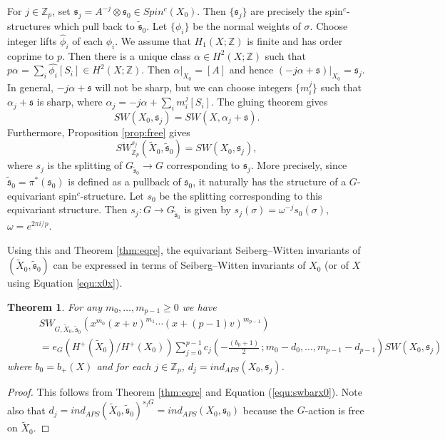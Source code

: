 \documentclass{amsart}
\newtheorem{theorem}{Theorem}[section]
\theoremstyle{definition}
\theoremstyle{remark}
\numberwithin{equation}{section}
\begin{document}
For $j \in \mathbb{Z}_p$, set $\mathfrak{s}_j = A^{-j} \otimes \mathfrak{s}_0 \in Spin^c(X_0)$. Then $\{ \mathfrak{s}_j \}$ are precisely the spin$^c$-structures which pull back to $\widetilde{\mathfrak{s}}_0$. Let $\{ \phi_i \}$ be the normal weights of $\sigma$. Choose integer lifts $\widehat{\phi}_i$ of each $\phi_i$. We assume that $H_1(X ; \mathbb{Z})$ is finite and has order coprime to $p$. Then there is a unique class $\alpha \in H^2(X ; \mathbb{Z})$ such that $p \alpha = \sum_i \widehat{\phi_i} [S_i] \in H^2(X ; \mathbb{Z})$. Then $\alpha|_{X_0} = [A]$ and hence $(-j \alpha + \mathfrak{s})|_{X_0} = \mathfrak{s}_j$. In general, $-j\alpha + \mathfrak{s}$ will not be sharp, but we can choose integers $\{ m_i^j\}$ such that $\alpha_j + \mathfrak{s}$ is sharp, where $\alpha_j = -j \alpha + \sum_i m_i^j [S_i]$. The gluing theorem gives 
\begin{equation}\label{equ:x0x}
SW(X_0 , \mathfrak{s}_{j}) = SW(X , \alpha_j + \mathfrak{s}).
\end{equation}
Furthermore, Proposition \ref{prop:free} gives
\begin{equation}\label{equ:swbarx0}
\overline{SW}_{\mathbb{Z}_p}^{s_j}( \widetilde{X}_0 , \widetilde{\mathfrak{s}}_0) = SW(X_0 , \mathfrak{s}_j),
\end{equation}
where $s_j$ is the splitting of $G_{\widetilde{\mathfrak{s}}_0} \to G$ corresponding to $\mathfrak{s}_j$. More precisely, since $\widetilde{\mathfrak{s}}_0 = \pi^*(\mathfrak{s}_0)$ is defined as a pullback of $\mathfrak{s}_0$, it naturally has the structure of a $G$-equivariant spin$^c$-structure. Let $s_0$ be the splitting corresponding to this equivariant structure. Then $s_j : G \to G_{\widetilde{\mathfrak{s}}_0}$ is given by $s_j(\sigma) = \omega^{-j} s_0(\sigma)$, $\omega = e^{2\pi i/p}$.

Using this and Theorem \ref{thm:eqre}, the equivariant Seiberg--Witten invariants of $(\widetilde{X}_0 , \widetilde{\mathfrak{s}}_0)$ can be expressed in terms of Seiberg--Witten invariants of $X_0$ (or of $X$ using Equation \ref{equ:x0x}).

\begin{theorem}\label{thm:sweqcov}
For any $m_0, \dots , m_{p-1} \ge 0$ we have
\begin{align*}
& SW_{G , \widetilde{X}_0 , \widetilde{\mathfrak{s}}_0}( x^{m_0} (x+v)^{m_1} \cdots (x+(p-1)v)^{m_{p-1}}) \\
\quad \quad &= e_{G}( H^+( \widetilde{X}_0)/H^+(X_0) ) \sum_{j=0}^{p-1} c_j\left( -\frac{ (b_0+1) }{2} \, ; m_0-d_0 , \dots , m_{p-1} - d_{p-1} \right) SW(X_0 , \mathfrak{s}_j)
\end{align*}
where $b_0 = b_+(X)$ and for each $j \in \mathbb{Z}_p$, $d_j = ind_{APS}( X_0 , \mathfrak{s}_j)$.
\end{theorem}
\begin{proof}
This follows from Theorem \ref{thm:eqre} and Equation (\ref{equ:swbarx0}). Note also that $d_j = ind_{APS}( \widetilde{X}_0 , \widetilde{\mathfrak{s}}_0)^{s_j G} = ind_{APS}(X_0 , \mathfrak{s}_0)$ because the $G$-action is free on $\widetilde{X}_0$.
\end{proof}
\end{document}

